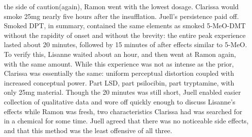 \documentclass[12pt]{book}
\begin{document}
the side of caution(again), Ramon went with the lowest dosage. Clarissa would smoke 25mg nearly five hours after the insufflation. Juell's persistence paid off. Smoked DPT, in summary, contained the same elements as smoked 5-MeO-DMT without the rapidity of onset and without the brevity: the entire peak experience lasted about 20 minutes, followed by 15 minutes of after effects similar to 5-MeO. To verify this, Lisanne waited about an hour, and then went at Ramon again, with the same amount. While this experience was not as intense as the prior, Clarissa was essentially the same: uniform perceptual distortion coupled with increased conceptual power. Part LSD, part psilocibin, part tryptamine, with only 25mg material. Though the 20 minutes was still short, Juell enabled easier collection of qualitative data and wore off quickly enough to discuss Lisanne's effects while Ramon was fresh, two characteristics Clarissa had was searched for in a chemical for some time. Juell agreed that there was no noticeable side effects, and that this method was the least offensive of all three.
\end{document}
